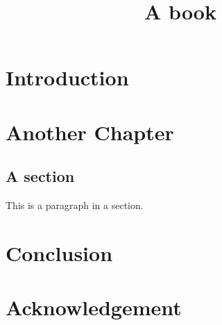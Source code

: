 \documentclass[12pt,a4paper]{book}
\title{A book}
\begin{document}
  \frontmatter
    \maketitle
    \tableofcontents
  \mainmatter
    \chapter{Introduction}
    \chapter{Another Chapter}
      \section{A section}
        This is a paragraph in a section.
    \chapter{Conclusion}
  \backmatter
    \chapter*{Acknowledgement}
    
\end{document}
